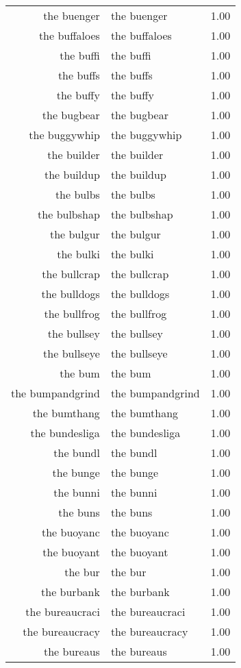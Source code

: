 \begin{table}[ht]
\begin{tabular}{rlr}
  the buenger & the buenger & 1.00 \\ 
  the buffaloes & the buffaloes & 1.00 \\ 
  the buffi & the buffi & 1.00 \\ 
  the buffs & the buffs & 1.00 \\ 
  the buffy & the buffy & 1.00 \\ 
  the bugbear & the bugbear & 1.00 \\ 
  the buggywhip & the buggywhip & 1.00 \\ 
  the builder & the builder & 1.00 \\ 
  the buildup & the buildup & 1.00 \\ 
  the bulbs & the bulbs & 1.00 \\ 
  the bulbshap & the bulbshap & 1.00 \\ 
  the bulgur & the bulgur & 1.00 \\ 
  the bulki & the bulki & 1.00 \\ 
  the bullcrap & the bullcrap & 1.00 \\ 
  the bulldogs & the bulldogs & 1.00 \\ 
  the bullfrog & the bullfrog & 1.00 \\ 
  the bullsey & the bullsey & 1.00 \\ 
  the bullseye & the bullseye & 1.00 \\ 
  the bum & the bum & 1.00 \\ 
  the bumpandgrind & the bumpandgrind & 1.00 \\ 
  the bumthang & the bumthang & 1.00 \\ 
  the bundesliga & the bundesliga & 1.00 \\ 
  the bundl & the bundl & 1.00 \\ 
  the bunge & the bunge & 1.00 \\ 
  the bunni & the bunni & 1.00 \\ 
  the buns & the buns & 1.00 \\ 
  the buoyanc & the buoyanc & 1.00 \\ 
  the buoyant & the buoyant & 1.00 \\ 
  the bur & the bur & 1.00 \\ 
  the burbank & the burbank & 1.00 \\ 
  the bureaucraci & the bureaucraci & 1.00 \\ 
  the bureaucracy & the bureaucracy & 1.00 \\ 
  the bureaus & the bureaus & 1.00 \\ 

\end{tabular}
\end{table}
